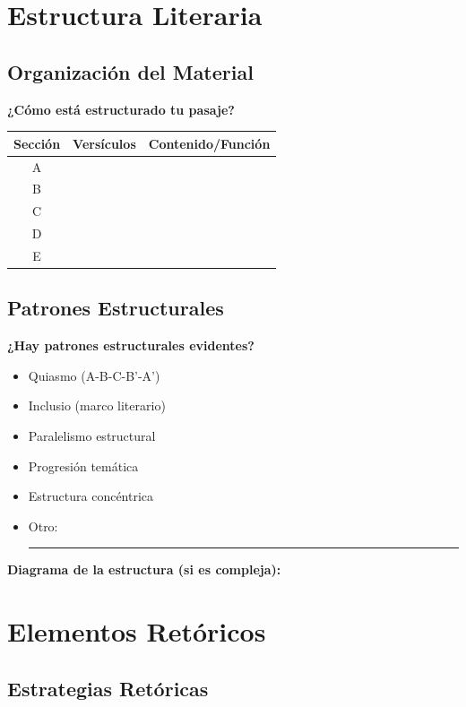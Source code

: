 \documentclass[11pt,a4paper]{article}
\begin{document}
\section{Estructura Literaria}

\subsection{Organización del Material}

\textbf{¿Cómo está estructurado tu pasaje?}

\begin{tabularx}{\textwidth}{|c|X|X|}
\hline
\textbf{Sección} & \textbf{Versículos} & \textbf{Contenido/Función} \\
\hline
A & & \\[1cm]
\hline
B & & \\[1cm]
\hline
C & & \\[1cm]
\hline
D & & \\[1cm]
\hline
E & & \\[1cm]
\hline
\end{tabularx}

\subsection{Patrones Estructurales}

\textbf{¿Hay patrones estructurales evidentes?}
\begin{itemize}[leftmargin=1cm]
    \item[$\square$] Quiasmo (A-B-C-B'-A')
    \item[$\square$] Inclusio (marco literario)
    \item[$\square$] Paralelismo estructural
    \item[$\square$] Progresión temática
    \item[$\square$] Estructura concéntrica
    \item[$\square$] Otro: \rule{6cm}{0.4pt}
\end{itemize}

\textbf{Diagrama de la estructura (si es compleja):}
\vspace{4cm}

\newpage

\section{Elementos Retóricos}

\subsection{Estrategias Retóricas}
\end{document}
